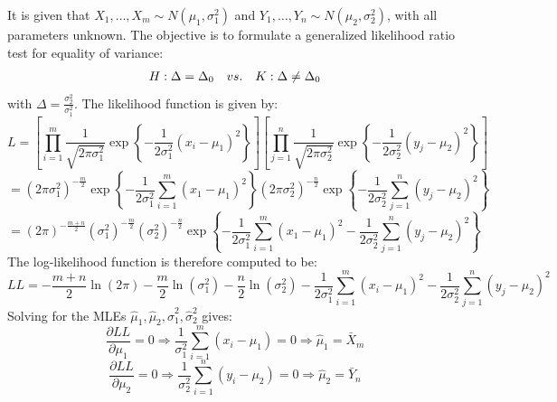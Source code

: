 \begin{homeworkProblem}
It is given that $X_1 , \ldots ,X_m \sim N\left( {\mu _1 ,\sigma _1^2 
} \right)$ and $Y_1 , \ldots ,Y_n \sim N\left( {\mu _2 ,\sigma _2^2 } 
\right)$, with all parameters unknown. The objective is to formulate a 
generalized likelihood ratio test for equality of variance:
\[
\begin{array}{*{20}c}
   {H:\Delta  = \Delta _0 } & {vs.} & {K:\Delta  \ne \Delta _0 }  \\

 \end{array} 
\]
with $\Delta  = \frac{{\sigma _2^2 }}{{\sigma _1^2 }}$.
The likelihood function is given by:
\[
L = \left[ {\prod\limits_{i = 1}^m {\frac{1}
{{\sqrt {2\pi \sigma _1^2 } }}\exp \left\{ { - \frac{1}
{{2\sigma _1^2 }}\left( {x_i  - \mu _1 } \right)^2 } \right\}} } 
\right]\left[ {\prod\limits_{j = 1}^n {\frac{1}
{{\sqrt {2\pi \sigma _2^2 } }}\exp \left\{ { - \frac{1}
{{2\sigma _2^2 }}\left( {y_j  - \mu _2 } \right)^2 } \right\}} } 
\right]
\]
\[
 = \left( {2\pi \sigma _1^2 } \right)^{ - \frac{m}
{2}} \exp \left\{ { - \frac{1}
{{2\sigma _1^2 }}\sum\limits_{i = 1}^m {\left( {x_1  - \mu _1 } 
\right)^2 } } \right\}\left( {2\pi \sigma _2^2 } \right)^{ - \frac{n}
{2}} \exp \left\{ { - \frac{1}
{{2\sigma _2^2 }}\sum\limits_{j = 1}^n {\left( {y_j  - \mu _2 } 
\right)^2 } } \right\}
\]
\[
 = \left( {2\pi } \right)^{ - \frac{{m + n}}
{2}} \left( {\sigma _1^2 } \right)^{ - \frac{m}
{2}} \left( {\sigma _2^2 } \right)^{ - \frac{n}
{2}} \exp \left\{ { - \frac{1}
{{2\sigma _1^2 }}\sum\limits_{i = 1}^m {\left( {x_1  - \mu _1 } 
\right)^2 }  - \frac{1}
{{2\sigma _2^2 }}\sum\limits_{j = 1}^n {\left( {y_j  - \mu _2 } 
\right)^2 } } \right\}
\]
The log-likelihood function is therefore computed to be:
\[
LL =  - \frac{{m + n}}
{2}\ln \left( {2\pi } \right) - \frac{m}
{2}\ln \left( {\sigma _1^2 } \right) - \frac{n}
{2}\ln \left( {\sigma _2^2 } \right) - \frac{1}
{{2\sigma _1^2 }}\sum\limits_{i = 1}^m {\left( {x_i  - \mu _1 } 
\right)^2 }  - \frac{1}
{{2\sigma _2^2 }}\sum\limits_{j = 1}^n {\left( {y_j  - \mu _2 } 
\right)^2 } 
\]
Solving for the MLEs $\hat \mu _1 ,\hat \mu _2 ,\hat \sigma _1^2,\hat 
\sigma _2^2$ gives:
\[
\frac{{\partial LL}}
{{\partial \mu _1 }} = 0 \Rightarrow \frac{1}
{{\sigma _1^2 }}\sum\limits_{i = 1}^m {\left( {x_i  - \mu _1 } 
\right)}  = 0 \Rightarrow \hat \mu _1  = \bar X_m 
\]
\[
\frac{{\partial LL}}
{{\partial \mu _2 }} = 0 \Rightarrow \frac{1}
{{\sigma _2^2 }}\sum\limits_{i = 1}^n {\left( {y_i  - \mu _2 } 
\right)}  = 0 \Rightarrow \hat \mu _2  = \bar Y_n 
\]
\end{homeworkProblem}
